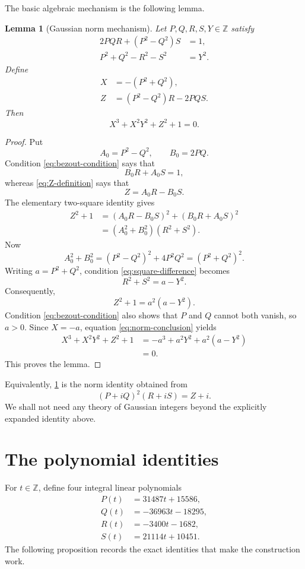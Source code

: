 \documentclass[11pt]{article}
\newtheorem{lemma}[lemma]{Lemma}
\theoremstyle{remark}
\newcommand{\Z}{\mathbb Z}
\begin{document}
The basic algebraic mechanism is the following lemma.

\begin{lemma}[Gaussian norm mechanism]\label{lem:gaussian}
Let $P,Q,R,S,Y\in\Z$ satisfy
\begin{align}
 2PQR+(P^2-Q^2)S&=1, \label{eq:bezout-condition}\\
 P^2+Q^2-R^2-S^2&=Y^2. \label{eq:square-difference}
\end{align}
Define
\begin{align}
 X&=-(P^2+Q^2), \label{eq:X-definition}\\
 Z&=(P^2-Q^2)R-2PQS. \label{eq:Z-definition}
\end{align}
Then
\[
 X^3+X^2Y^2+Z^2+1=0.
\]
\end{lemma}

\begin{proof}
Put
\[
 A_0=P^2-Q^2,
 \qquad
 B_0=2PQ.
\]
Condition \eqref{eq:bezout-condition} says that
\[
 B_0R+A_0S=1,
\]
whereas \eqref{eq:Z-definition} says that
\[
 Z=A_0R-B_0S.
\]
The elementary two-square identity gives
\begin{align*}
 Z^2+1
 &= (A_0R-B_0S)^2+(B_0R+A_0S)^2\\
 &= (A_0^2+B_0^2)(R^2+S^2).
\end{align*}
Now
\[
 A_0^2+B_0^2
 =(P^2-Q^2)^2+4P^2Q^2
 =(P^2+Q^2)^2.
\]
Writing $a=P^2+Q^2$, condition \eqref{eq:square-difference} becomes
\[
 R^2+S^2=a-Y^2.
\]
Consequently,
\begin{equation}\label{eq:norm-conclusion}
 Z^2+1=a^2(a-Y^2).
\end{equation}
Condition \eqref{eq:bezout-condition} also shows that $P$ and $Q$ cannot both vanish, so $a>0$.  Since $X=-a$, equation \eqref{eq:norm-conclusion} yields
\begin{align*}
 X^3+X^2Y^2+Z^2+1
 &=-a^3+a^2Y^2+a^2(a-Y^2)\\
 &=0.
\end{align*}
This proves the lemma.
\end{proof}

Equivalently, \cref{lem:gaussian} is the norm identity obtained from
\[
 (P+iQ)^2(R+iS)=Z+i.
\]
We shall not need any theory of Gaussian integers beyond the explicitly expanded identity above.

\section{The polynomial identities}

For $t\in\Z$, define four integral linear polynomials
\begin{align}
 P(t)&=31487t+15586, \label{eq:P-poly}\\
 Q(t)&=-36963t-18295, \label{eq:Q-poly}\\
 R(t)&=-3400t-1682, \label{eq:R-poly}\\
 S(t)&=21114t+10451. \label{eq:S-poly}
\end{align}
The following proposition records the exact identities that make the construction work.
\end{document}
